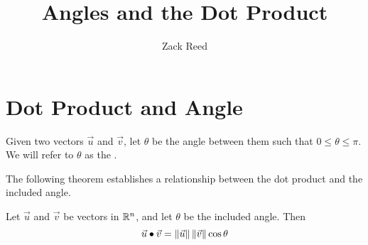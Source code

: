 \documentclass{ximera}
\author{Zack Reed}
\title{Angles and the Dot Product}
\begin{document}
\begin{abstract}

\end{abstract}
\maketitle

\section*{Dot Product and Angle}
 
Given two vectors $\vec{u}$ and $\vec{v}$, let $\theta$ be the angle between them such that $0\leq\theta\leq \pi$.  We will refer to $\theta$ as the .
 
\begin{center}
\end{center}
 
The following theorem establishes a relationship between the dot product and the included angle.
 
  \begin{theorem}\label{th:dotproductcosine} Let $\vec{u}$ and $\vec{v}$ be vectors in $\mathbb{R}^n$, and let $\theta$ be the included angle.  Then
  \begin{equation*} \label{matlintrans}
 \vec{u}\bullet\vec{v}=\left\|\vec{u}\right\|\left\|\vec{v}\right\|\cos \theta
\end{equation*}
\end{theorem}
 
\end{document}
